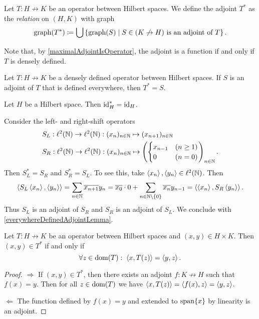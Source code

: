 \begin{definition}
Let $T: H\not\to K$ be an operator between Hilbert spaces. We define the adjoint $T^*$ as the \emph{relation} on $(H,K)$ with graph
\[ \operatorname{graph}(T^*) \coloneqq \bigcup\left\{ \operatorname{graph}(S) \;\middle|\; \text{$S\in (K\not\to H)$ is an adjoint of $T$} \right\}. \]
\end{definition}
Note that, by \ref{maximalAdjointIsOperator}, the adjoint is a function if and only if $T$ is densely defined.

\begin{lemma} \label{everywhereDefinedAdjointLemma}
Let $T: H\not\to K$ be a densely defined operator between Hilbert spaces. If $S$ is an adjoint of $T$ that is defined everywhere, then $T^* = S$.
\end{lemma}
\begin{corollary}
Let $H$ be a Hilbert space. Then $\operatorname{id}_H^* = \operatorname{id}_H$.
\end{corollary}

\begin{example}
Consider the left- and right-shift operators
\begin{align*}
&S_L: \ell^2(\mathbb{N}) \to \ell^2(\mathbb{N}): (x_n)_{n\in\mathbb{N}} \mapsto (x_{n+1})_{n\in\mathbb{N}} \\
&S_R: \ell^2(\mathbb{N}) \to \ell^2(\mathbb{N}): (x_n)_{n\in\mathbb{N}} \mapsto \left(\begin{cases}
x_{n-1} & (n\geq 1) \\ 0 &(n=0)
\end{cases}\right)_{n\in \mathbb{N}}.
\end{align*}
Then $S_L^* = S_R$ and $S_R^* = S_L$. To see this, take $\left\langle x_n \right\rangle, \left\langle y_n \right\rangle\in \ell^2(\mathbb{N})$. Then
\[ \left\langle S_L\left\langle x_n \right\rangle, \left\langle y_n \right\rangle \right\rangle = \sum_{n\in\mathbb{N}}\overline{x_{n+1}}y_n = \overline{x_0}\cdot 0 + \sum_{n\in\mathbb{N}\setminus\{0\}}\overline{x_{n}}y_{n-1} = \left\langle \left\langle x_n \right\rangle, S_R\left\langle y_n \right\rangle \right\rangle. \]
Thus $S_L$ is an adjoint of $S_R$ and $S_R$ is an adjoint of $S_L$. We conclude with \ref{everywhereDefinedAdjointLemma}.
\end{example}

\begin{lemma} \label{adjointRelationLemma}
Let $T: H\not\to K$ be an operator between Hilbert spaces and $(x,y)\in H\times K$. Then $(x, y)\in T^*$ \textup{if and only if}
\[ \forall z\in\operatorname{dom}(T): \; \left\langle x, T(z) \right\rangle = \left\langle y, z \right\rangle. \]
\end{lemma}
\begin{proof}
$\boxed{\Rightarrow}$ If $(x, y)\in T^*$, then there exists an adjoint $f: K\not\to H$ such that $f(x) = y$. Then for all $z\in \operatorname{dom}(T)$ we have $\left\langle x, T(z) \right\rangle = \left\langle f(x), z \right\rangle = \left\langle y, z \right\rangle$.

$\boxed{\Leftarrow}$ The function defined by $f(x) = y$ and extended to $\operatorname{span}\{x\}$ by linearity is an adjoint.
\end{proof}

